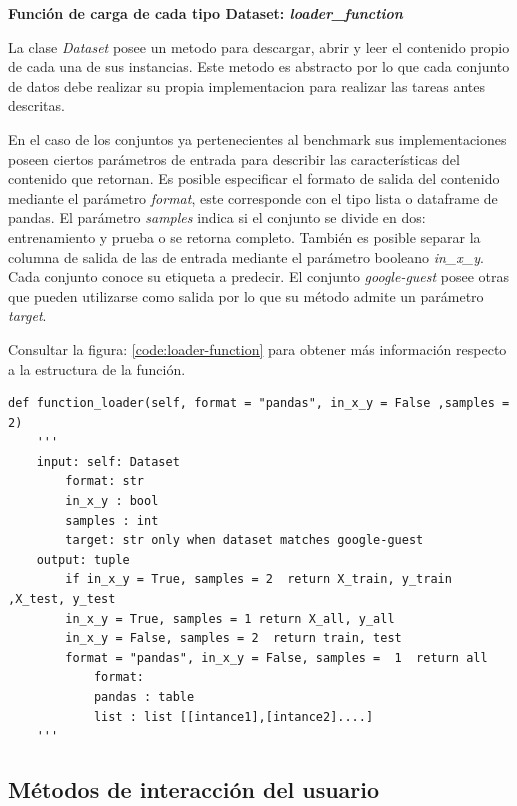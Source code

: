 \begin{flushleft} 
    { \textbf{Función de carga de cada tipo Dataset: \textit{loader\_function}}}\label{class:loader-function}
\end{flushleft}
La clase \textit{Dataset} posee un metodo para descargar, abrir y leer el contenido propio de cada una de sus instancias.
Este metodo es abstracto por lo que cada conjunto de datos debe realizar su propia implementacion para realizar las tareas antes descritas. 

En el caso de los conjuntos ya pertenecientes al benchmark sus implementaciones poseen ciertos parámetros de entrada para describir las características del 
contenido que retornan. Es posible especificar el formato de salida del contenido mediante el parámetro \textit{format}, este corresponde con el tipo lista o 
dataframe de pandas. 
El parámetro \textit{samples} indica si el conjunto se divide en dos: entrenamiento y prueba o se retorna completo. 
También es posible separar la columna de salida de las de entrada mediante el parámetro booleano \textit{in\_x\_y}. 
Cada conjunto conoce su etiqueta a predecir. El conjunto \textit{google-guest} posee otras que pueden utilizarse como salida por lo que su método admite un 
parámetro \textit{target}.  

Consultar la figura: \ref{code:loader-function} para obtener más información respecto a la estructura de la función. 

\begin{lstlisting}[caption=Estructura de las fuciones de carga de los dataset, label = code:loader-function]
def function_loader(self, format = "pandas", in_x_y = False ,samples =  2)
    '''
    input: self: Dataset
        format: str
        in_x_y : bool
        samples : int
        target: str only when dataset matches google-guest
    output: tuple	   
        if in_x_y = True, samples = 2  return X_train, y_train ,X_test, y_test
        in_x_y = True, samples = 1 return X_all, y_all
        in_x_y = False, samples = 2  return train, test
        format = "pandas", in_x_y = False, samples =  1  return all
            format:
            pandas : table 
            list : list [[intance1],[intance2]....]
    '''
    \end{lstlisting}


\subsection{Métodos de interacción del usuario}\label{subsection:methods}

